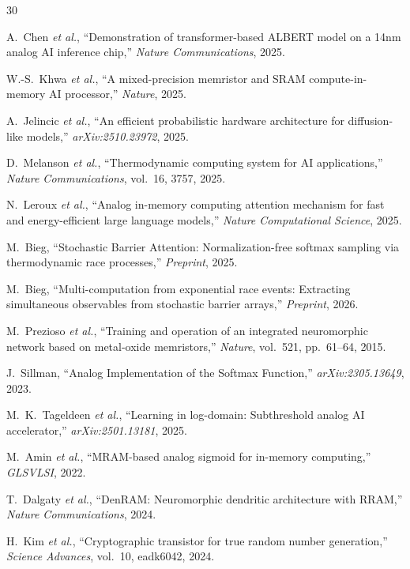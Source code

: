 \documentclass[11pt]{article}
\begin{document}
\begin{thebibliography}{30}

 A.~Chen \textit{et al.}, ``Demonstration of transformer-based ALBERT model on a 14nm analog AI inference chip,'' \textit{Nature Communications}, 2025.

 W.-S.~Khwa \textit{et al.}, ``A mixed-precision memristor and SRAM compute-in-memory AI processor,'' \textit{Nature}, 2025.

 A.~Jelincic \textit{et al.}, ``An efficient probabilistic hardware architecture for diffusion-like models,'' \textit{arXiv:2510.23972}, 2025.

 D.~Melanson \textit{et al.}, ``Thermodynamic computing system for AI applications,'' \textit{Nature Communications}, vol.~16, 3757, 2025.

 N.~Leroux \textit{et al.}, ``Analog in-memory computing attention mechanism for fast and energy-efficient large language models,'' \textit{Nature Computational Science}, 2025.

 M.~Bieg, ``Stochastic Barrier Attention: Normalization-free softmax sampling via thermodynamic race processes,'' \textit{Preprint}, 2025.

 M.~Bieg, ``Multi-computation from exponential race events: Extracting simultaneous observables from stochastic barrier arrays,'' \textit{Preprint}, 2026.

 M.~Prezioso \textit{et al.}, ``Training and operation of an integrated neuromorphic network based on metal-oxide memristors,'' \textit{Nature}, vol.~521, pp.~61--64, 2015.

 J.~Sillman, ``Analog Implementation of the Softmax Function,'' \textit{arXiv:2305.13649}, 2023.

 M.~K.~Tageldeen \textit{et al.}, ``Learning in log-domain: Subthreshold analog AI accelerator,'' \textit{arXiv:2501.13181}, 2025.

 M.~Amin \textit{et al.}, ``MRAM-based analog sigmoid for in-memory computing,'' \textit{GLSVLSI}, 2022.

 T.~Dalgaty \textit{et al.}, ``DenRAM: Neuromorphic dendritic architecture with RRAM,'' \textit{Nature Communications}, 2024.

 H.~Kim \textit{et al.}, ``Cryptographic transistor for true random number generation,'' \textit{Science Advances}, vol.~10, eadk6042, 2024.


\end{thebibliography}
\end{document}
